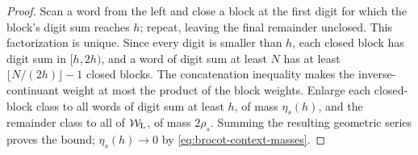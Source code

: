 \begin{proof}
Scan a word from the left and close a block at the first digit for which the
block's digit sum reaches \(h\); repeat, leaving the final remainder
unclosed.  This factorization is unique.  Since every digit is smaller than
\(h\), each closed block has digit sum in \([h,2h)\), and a word of digit sum
at least \(N\) has at least \(\lfloor N/(2h)\rfloor-1\) closed blocks.
The concatenation inequality makes the inverse-continuant weight at most the
product of the block weights.  Enlarge each closed-block class to all words
of digit sum at least \(h\), of mass \(\eta_s(h)\), and the remainder class
to all of \(\mathcal W_{\rm L}\), of mass \(2\rho_s\).  Summing the resulting
geometric series proves the bound; \(\eta_s(h)\to0\) by
\eqref{eq:brocot-context-masses}.
\end{proof}

